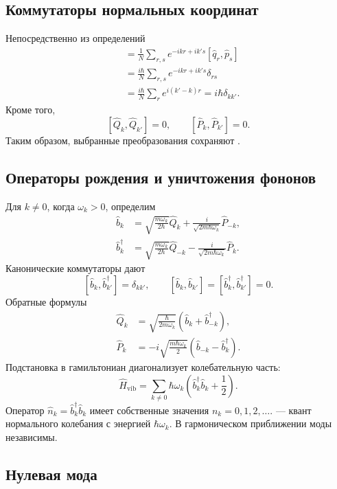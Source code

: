 \documentclass[../final.tex]{subfiles}
\begin{document}
\subsection*{Коммутаторы нормальных координат}

Непосредственно из определений
\begin{align*}
    [\hat Q_k,\hat P_{k'}]
       &=\frac1N\sum_{r,s}e^{-ikr+ik's}[\hat q_r,\hat p_s]\\
       &=\frac{i\hbar}N\sum_{r,s}e^{-ikr+ik's}\delta_{rs}\\
       &=\frac{i\hbar}N\sum_r e^{i(k'-k)r}
         =i\hbar\delta_{kk'}.
\end{align*}
Кроме того,
\[
    [\hat Q_k,\hat Q_{k'}]=0,\qquad
    [\hat P_k,\hat P_{k'}]=0.
\]
Таким образом, выбранные преобразования сохраняют
.

\subsection*{Операторы рождения и уничтожения фононов}

Для $k\ne0$, когда $\omega_k>0$, определим
\begin{align*}
    \hat b_k&=\sqrt{\frac{m\omega_k}{2\hbar}}\hat Q_k
       +\frac{i}{\sqrt{2m\hbar\omega_k}}\hat P_{-k},\\
    \hat b_k^\dagger&=\sqrt{\frac{m\omega_k}{2\hbar}}\hat Q_{-k}
       -\frac{i}{\sqrt{2m\hbar\omega_k}}\hat P_k.
\end{align*}
Канонические коммутаторы дают
\[
    [\hat b_k,\hat b_{k'}^\dagger]=\delta_{kk'},\qquad
    [\hat b_k,\hat b_{k'}]=[\hat b_k^\dagger,\hat b_{k'}^\dagger]=0.
\]
Обратные формулы
\begin{align*}
    \hat Q_k&=\sqrt{\frac{\hbar}{2m\omega_k}}
          (\hat b_k+\hat b_{-k}^\dagger),\\
    \hat P_k&=-i\sqrt{\frac{m\hbar\omega_k}{2}}
          (\hat b_{-k}-\hat b_k^\dagger).
\end{align*}
Подстановка в гамильтониан диагонализует колебательную часть:
\[
    \hat H_{\mathrm{vib}}
       =\sum_{k\ne0}\hbar\omega_k
          \left(\hat b_k^\dagger\hat b_k+\frac12\right).
\]
Оператор $\hat n_k=\hat b_k^\dagger\hat b_k$ имеет собственные значения
$n_k=0,1,2,\ldots$.
 --- квант нормального колебания с энергией
$\hbar\omega_k$. В гармоническом приближении моды независимы.

\subsection*{Нулевая мода}
\end{document}
